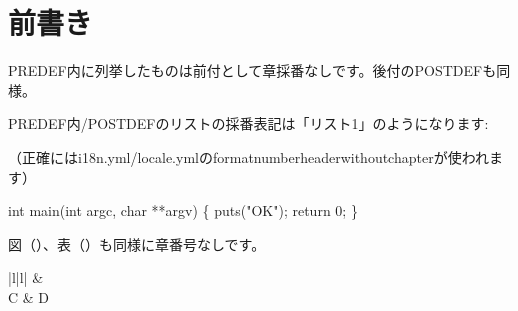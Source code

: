 \chapter{前書き}
\label{chap:pre01}

PREDEF内に列挙したものは前付として章採番なしです。後付のPOSTDEFも同様。

PREDEF内/POSTDEFのリストの採番表記は「リスト1」のようになります: 

（正確にはi18n.yml/locale.ymlのformat\textunderscore{}number\textunderscore{}header\textunderscore{}without\textunderscore{}chapterが使われます）

\begin{reviewlistblock}
\begin{reviewlist}
int
main(int argc, char **argv)
\{
    puts("OK");
    return 0;
\}
\end{reviewlist}
\end{reviewlistblock}

図（）、表（）も同様に章番号なしです。

\begin{reviewimage}%
\label{image:pre01:fractal}
\end{reviewimage}
\begin{table}%
\label{table:pre01:tbl1}
\begin{reviewtable}{|l|l|}
\hline
{} &  \\  \hline
C & D \\  \hline
\end{reviewtable}
\end{table}
